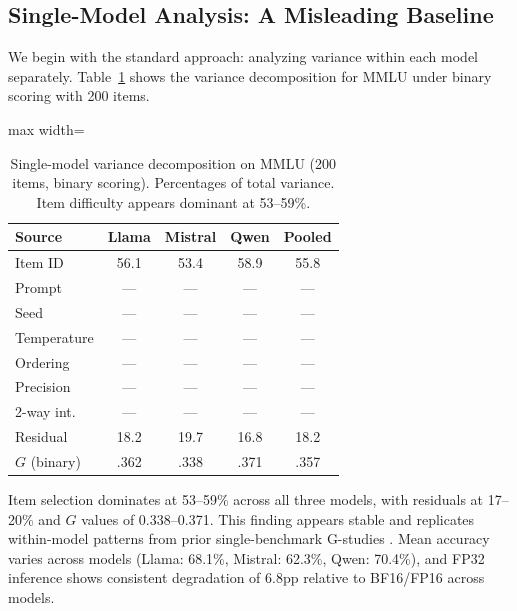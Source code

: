 \documentclass[11pt,twocolumn]{article}
\newcommand{\Gcoeff}{\ensuremath{G}}
\newcommand{\pct}{\%}
\begin{document}
\subsection{Single-Model Analysis: A Misleading Baseline}
\label{sec:single_model}

We begin with the standard approach: analyzing variance within each model separately. Table~\ref{tab:single_model} shows the variance decomposition for MMLU under binary scoring with 200 items.

\begin{table}[t]
\centering
\caption{Single-model variance decomposition on MMLU (200 items, binary scoring). Percentages of total variance. Item difficulty appears dominant at 53--59\pct{}.}
\label{tab:single_model}
\small
\begin{adjustbox}{max width=\columnwidth}
\begin{tabular}{@{}lcccc@{}}
\toprule
\textbf{Source} & \textbf{Llama} & \textbf{Mistral} & \textbf{Qwen} & \textbf{Pooled} \\
\midrule
Item ID          & 56.1 & 53.4 & 58.9 & 55.8 \\
Prompt           &  ---  &  ---  &  ---  &  --- \\
Seed             &  ---  &  ---  &  ---  &  --- \\
Temperature      &  ---  &  ---  &  ---  &  --- \\
Ordering         &  ---  &  ---  &  ---  &  --- \\
Precision        &  ---  &  ---  &  ---  &  --- \\
2-way int.       &  ---  &  ---  &  ---  &  --- \\
Residual         & 18.2 & 19.7 & 16.8 & 18.2 \\
\midrule
$\Gcoeff$ (binary)  & .362 & .338 & .371 & .357 \\
\bottomrule
\end{tabular}
\end{adjustbox}
\vspace{-2mm}
\end{table}

Item selection dominates at 53--59\pct{} across all three models, with residuals at 17--20\pct{} and $\Gcoeff$ values of 0.338--0.371. This finding appears stable and replicates within-model patterns from prior single-benchmark G-studies \cite{mesting2026generalizability}. Mean accuracy varies across models (Llama: 68.1\pct{}, Mistral: 62.3\pct{}, Qwen: 70.4\pct{}), and FP32 inference shows consistent degradation of 6.8pp relative to BF16/FP16 across models.
\end{document}
